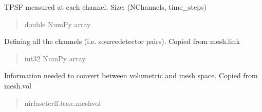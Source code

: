 \documentclass[letterpaper,10pt,english]{sphinxmanual}
\begin{document}
\begin{fulllineitems}
\begin{fulllineitems}
\begin{quote}
\begin{description}
\end{description}\end{quote}

\end{fulllineitems}


\begin{fulllineitems}
\label{\detokenize{_autosummary/nirfasterff.base.data.TPSFdata:nirfasterff.base.data.TPSFdata.tpsf}}
\pysigstartsignatures
{}
\pysigstopsignatures
\sphinxAtStartPar
TPSF measured at each channel. Size: (NChannels, time\_steps)
\begin{quote}\begin{description}
\sphinxAtStartPar
double NumPy array

\end{description}\end{quote}

\end{fulllineitems}


\begin{fulllineitems}
\label{\detokenize{_autosummary/nirfasterff.base.data.TPSFdata:nirfasterff.base.data.TPSFdata.link}}
\pysigstartsignatures
{}
\pysigstopsignatures
\sphinxAtStartPar
Defining all the channels (i.e. source\sphinxhyphen{}detector pairs). Copied from mesh.link
\begin{quote}\begin{description}
\sphinxAtStartPar
int32 NumPy array

\end{description}\end{quote}

\end{fulllineitems}


\begin{fulllineitems}
\label{\detokenize{_autosummary/nirfasterff.base.data.TPSFdata:nirfasterff.base.data.TPSFdata.vol}}
\pysigstartsignatures
{}
\pysigstopsignatures
\sphinxAtStartPar
Information needed to convert between volumetric and mesh space. Copied from mesh.vol
\begin{quote}\begin{description}
\sphinxAtStartPar
nirfaseterff.base.meshvol


\end{description}
\end{quote}
\end{fulllineitems}
\end{fulllineitems}
\end{document}

